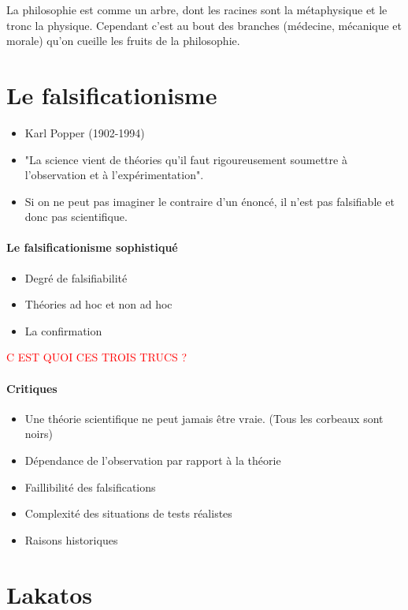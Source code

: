 \documentclass[fleqn,letterpaper, 12pt]{article}
\begin{document}
	La philosophie est comme un arbre, dont les racines sont la métaphysique et le tronc la physique. Cependant c'est au bout des branches (médecine, mécanique et morale) qu'on cueille les fruits de la philosophie.
	
	
	\section{Le falsificationisme}
	
	\begin{itemize}
		\item Karl Popper (1902-1994)
		\item "La science vient de théories qu'il faut rigoureusement soumettre à l'observation et à l'expérimentation".
		\item Si on ne peut pas imaginer le contraire d'un énoncé, il n'est pas falsifiable et donc pas scientifique.
	\end{itemize}
	
	\paragraph{Le falsificationisme sophistiqué}
	\begin{itemize}
		\item Degré de falsifiabilité
		\item Théories ad hoc et non ad hoc 
		\item La confirmation
	\end{itemize}
	
	\textcolor{red}{C EST QUOI CES TROIS TRUCS ?}
	\paragraph{Critiques}
	\begin{itemize}
		\item Une théorie scientifique ne peut jamais être vraie. (Tous les corbeaux sont noirs)
		\item Dépendance de l'observation par rapport à la théorie
		\item Faillibilité des falsifications
		\item Complexité des situations de tests réalistes
		\item Raisons historiques
	\end{itemize}
	
	\section{Lakatos}
	
\end{document}
